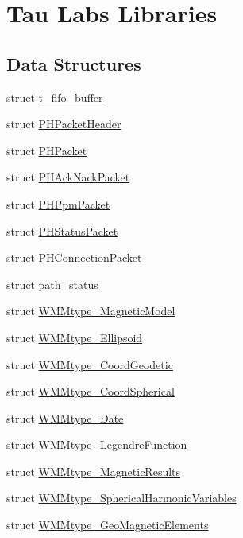 \hypertarget{group___tau_labs_libraries}{\section{\-Tau \-Labs \-Libraries}
\label{group___tau_labs_libraries}
}
\subsection*{\-Data \-Structures}
\begin{DoxyCompactItemize}
\item 
struct \hyperlink{structt__fifo__buffer}{t\-\_\-fifo\-\_\-buffer}
\item 
struct \hyperlink{struct_p_h_packet_header}{\-P\-H\-Packet\-Header}
\item 
struct \hyperlink{struct_p_h_packet}{\-P\-H\-Packet}
\item 
struct \hyperlink{struct_p_h_ack_nack_packet}{\-P\-H\-Ack\-Nack\-Packet}
\item 
struct \hyperlink{struct_p_h_ppm_packet}{\-P\-H\-Ppm\-Packet}
\item 
struct \hyperlink{struct_p_h_status_packet}{\-P\-H\-Status\-Packet}
\item 
struct \hyperlink{struct_p_h_connection_packet}{\-P\-H\-Connection\-Packet}
\item 
struct \hyperlink{structpath__status}{path\-\_\-status}
\item 
struct \hyperlink{struct_w_m_mtype___magnetic_model}{\-W\-M\-Mtype\-\_\-\-Magnetic\-Model}
\item 
struct \hyperlink{struct_w_m_mtype___ellipsoid}{\-W\-M\-Mtype\-\_\-\-Ellipsoid}
\item 
struct \hyperlink{struct_w_m_mtype___coord_geodetic}{\-W\-M\-Mtype\-\_\-\-Coord\-Geodetic}
\item 
struct \hyperlink{struct_w_m_mtype___coord_spherical}{\-W\-M\-Mtype\-\_\-\-Coord\-Spherical}
\item 
struct \hyperlink{struct_w_m_mtype___date}{\-W\-M\-Mtype\-\_\-\-Date}
\item 
struct \hyperlink{struct_w_m_mtype___legendre_function}{\-W\-M\-Mtype\-\_\-\-Legendre\-Function}
\item 
struct \hyperlink{struct_w_m_mtype___magnetic_results}{\-W\-M\-Mtype\-\_\-\-Magnetic\-Results}
\item 
struct \hyperlink{struct_w_m_mtype___spherical_harmonic_variables}{\-W\-M\-Mtype\-\_\-\-Spherical\-Harmonic\-Variables}
\item 
struct \hyperlink{struct_w_m_mtype___geo_magnetic_elements}{\-W\-M\-Mtype\-\_\-\-Geo\-Magnetic\-Elements}
\end{DoxyCompactItemize}
